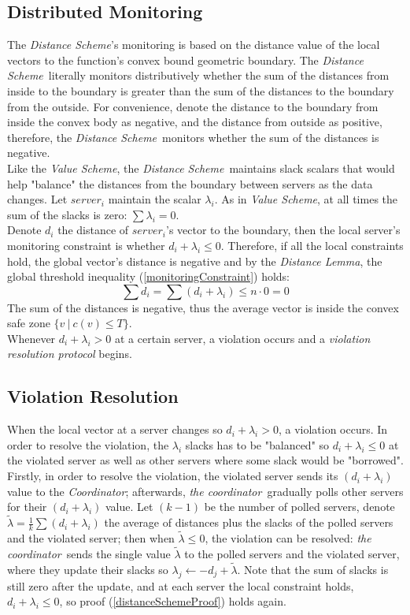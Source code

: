 \documentclass[10pt, conference]{IEEEtran}
\newcommand{\valueScheme}{\textit{Value Scheme}}
\newcommand{\distanceScheme}{\textit{Distance Scheme}}
\newcommand{\distanceLemma}{\textit{Distance Lemma}}
\newcommand{\theCoordinator}{\textit{the coordinator}}
\newcommand{\Coordinator}{\textit{Coordinator}}
\begin{document}
\subsection{Distributed Monitoring}
The \distanceScheme 's monitoring is based on the distance value of the local vectors to the function's convex bound geometric boundary. The \distanceScheme \ literally monitors distributively whether the sum of the distances from inside to the boundary is greater than the sum of the distances to the boundary from the outside. For convenience, denote the distance to the boundary from inside the convex body as negative, and the distance from outside as positive, therefore, the \distanceScheme \ monitors whether the sum of the distances is negative. \\
Like the \valueScheme , the \distanceScheme \ maintains slack scalars that would help "balance" the distances from the boundary between servers as the data changes. Let $server_i$ maintain the scalar $\lambda _i$. As in \valueScheme , at all times the sum of the slacks is zero: ${\sum {\lambda _i} = 0}$. \\
Denote $d_i$ the distance of $server_i$'s vector to the boundary, then the local server's monitoring constraint is whether ${d_i + \lambda_i \leq 0}$. Therefore, if all the local constraints hold, the global vector's distance is negative and by the \distanceLemma , the global threshold inequality (\ref{monitoringConstraint}) holds:
\begin{equation}
\label{distanceSchemeProof}
\sum{d_i} = \sum{(d_i + \lambda _i)} \leq n \cdot 0 = 0
\end{equation}
The sum of the distances is negative, thus the average vector is inside the convex safe zone ${\{v \ | \ c(v) \leq T \}}$. \\
Whenever ${d_i + \lambda _i > 0}$ at a certain server, a violation occurs and a  \textit{violation resolution protocol} begins. 
\subsection{Violation Resolution}
When the local vector at a server changes so ${d_i + \lambda _i > 0}$, a violation occurs. In order to resolve the violation, the $\lambda _i$ slacks has to be "balanced" so ${d_i + \lambda _i \leq 0}$ at the violated server as well as other servers where some slack would be "borrowed". \\
Firstly, in order to resolve the violation, the violated server sends its ${(d_i + \lambda _i)}$ value to the \Coordinator ; afterwards, \theCoordinator \ gradually polls other servers for their ${(d_i + \lambda _i)}$ value. Let $(k-1)$ be the number of polled servers, denote ${\widetilde{\lambda} = \frac{1}{k}\sum(d_i + \lambda _i)}$ the average of distances plus the slacks of the polled servers and the violated server; then when ${\widetilde{\lambda} \leq 0}$, the violation can be resolved: \theCoordinator \ sends the single value $\widetilde{\lambda}$ to the polled servers and the violated server, where they update their slacks so ${\lambda _j 
\leftarrow -d_j + \widetilde{\lambda}}$. Note that the sum of slacks is still zero after the update, and at each server the local constraint holds, ${d_i + \lambda _i \leq 0}$, so proof (\ref{distanceSchemeProof}) holds again.
\end{document}

